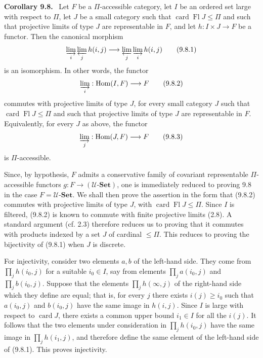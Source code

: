 \documentclass[11pt]{article}
\newcommand{\U}{\mathcal{U}}
\newcommand{\Set}{\mathbf{Set}}
\newcommand{\card}{\operatorname{card}}
\newcommand{\Fl}{\operatorname{Fl}}
\newcommand{\Hhom}{\operatorname{Hom}}
\newenvironment{statement}[1]{\par\medskip\noindent\textbf{#1.}\ }{\par\medskip}
\begin{document}
\begin{statement}{Corollary 9.8}
Let $F$ be a $\Pi$-accessible category, let $I$ be an ordered set large with respect to $\Pi$, let $J$ be a small category such that $\card\Fl J\leq \Pi$ and such that projective limits of type $J$ are representable in $F$, and let $h:I\times J\to F$ be a functor. Then the canonical morphism
\begin{equation}
 \varinjlim_i \varprojlim_j h(i,j)
 \longrightarrow
 \varprojlim_j \varinjlim_i h(i,j)
\tag{9.8.1}
\end{equation}
is an isomorphism. In other words, the functor
\begin{equation}
 \varinjlim_i:\Hhom(I,F)\longrightarrow F
\tag{9.8.2}
\end{equation}
commutes with projective limits of type $J$, for every small category $J$ such that $\card\Fl J\leq \Pi$ and such that projective limits of type $J$ are representable in $F$. Equivalently, for every $J$ as above, the functor
\begin{equation}
 \varinjlim_j:\Hhom(J,F)\longrightarrow F
\tag{9.8.3}
\end{equation}
is $\Pi$-accessible.
\end{statement}

Since, by hypothesis, $F$ admits a conservative family of covariant representable $\Pi$-accessible functors $g:F\to(\U\text{-}\Set)$, one is immediately reduced to proving 9.8 in the case $F=\U\text{-}\Set$. We shall then prove the assertion in the form that (9.8.2) commutes with projective limits of type $J$, with $\card\Fl J\leq \Pi$. Since $I$ is filtered, (9.8.2) is known to commute with finite projective limits (2.8). A standard argument (cf. 2.3) therefore reduces us to proving that it commutes with products indexed by a set $J$ of cardinal $\leq\Pi$. This reduces to proving the bijectivity of (9.8.1) when $J$ is discrete.

For injectivity, consider two elements $a,b$ of the left-hand side. They come from $\prod_j h(i_0,j)$ for a suitable $i_0\in I$, say from elements $\prod_j a(i_0,j)$ and $\prod_j b(i_0,j)$. Suppose that the elements $\prod_j h(\infty,j)$ of the right-hand side which they define are equal; that is, for every $j$ there exists $i(j)\geq i_0$ such that $a(i_0,j)$ and $b(i_0,j)$ have the same image in $h(i,j)$. Since $I$ is large with respect to $\card J$, there exists a common upper bound $i_1\in I$ for all the $i(j)$. It follows that the two elements under consideration in $\prod_j h(i_0,j)$ have the same image in $\prod_j h(i_1,j)$, and therefore define the same element of the left-hand side of (9.8.1). This proves injectivity.
\end{document}
